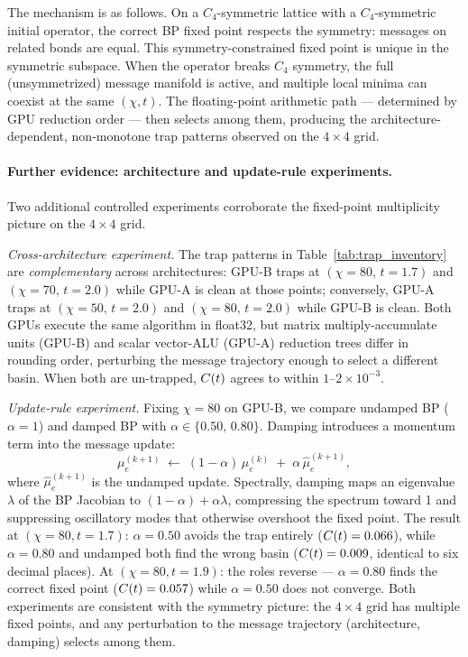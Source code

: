 The mechanism is as follows.
On a $C_4$-symmetric lattice with a $C_4$-symmetric initial operator, the
correct BP fixed point respects the symmetry: messages on related bonds are
equal.
This symmetry-constrained fixed point is unique in the symmetric subspace.
When the operator breaks $C_4$ symmetry, the full (unsymmetrized) message
manifold is active, and multiple local minima can coexist at the same $(\chi,
t)$.
The floating-point arithmetic path --- determined by GPU reduction order ---
then selects among them, producing the architecture-dependent, non-monotone
trap patterns observed on the $4\times4$ grid.

\paragraph{Further evidence: architecture and update-rule experiments.}
Two additional controlled experiments corroborate the fixed-point multiplicity
picture on the $4\times4$ grid.

\emph{Cross-architecture experiment.}
The trap patterns in Table~\ref{tab:trap_inventory} are \emph{complementary} across
architectures: GPU-B traps at $(\chi=80,\,t=1.7)$ and $(\chi=70,\,t=2.0)$
while GPU-A is clean at those points; conversely, GPU-A traps at
$(\chi=50,\,t=2.0)$ and $(\chi=80,\,t=2.0)$ while GPU-B is clean.
Both GPUs execute the same algorithm in float32, but matrix multiply-accumulate units (GPU-B) and
scalar vector-ALU (GPU-A) reduction trees differ in rounding order,
perturbing the message trajectory enough to select a different basin.
When both are un-trapped, $C(t)$ agrees to within $1$--$2\times10^{-3}$.

\emph{Update-rule experiment.}
Fixing $\chi=80$ on GPU-B, we compare undamped BP ($\alpha=1$) and damped BP
with $\alpha \in \{0.50,\, 0.80\}$.
Damping introduces a momentum term into the message update:
\begin{equation}
 \mu_e^{(k+1)}
 \;\leftarrow\;
 (1-\alpha)\,\mu_e^{(k)} \;+\; \alpha\,\hat{\mu}_e^{(k+1)},
 \label{eq:damping}
\end{equation}
where $\hat{\mu}_e^{(k+1)}$ is the undamped update.
Spectrally, damping maps an eigenvalue $\lambda$ of the BP Jacobian to
$(1-\alpha) + \alpha\lambda$, compressing the spectrum toward 1 and
suppressing oscillatory modes that otherwise overshoot the fixed point.
The result at $(\chi=80, t=1.7)$: $\alpha=0.50$ avoids the trap entirely
($C(t) = 0.066$), while $\alpha=0.80$ and undamped both find the wrong basin
($C(t) = 0.009$, identical to six decimal places).
At $(\chi=80, t=1.9)$: the roles reverse --- $\alpha=0.80$ finds the correct
fixed point ($C(t) = 0.057$) while $\alpha=0.50$ does not converge.
Both experiments are consistent with the symmetry picture: the $4\times4$ grid
has multiple fixed points, and any perturbation to the message trajectory
(architecture, damping) selects among them.

